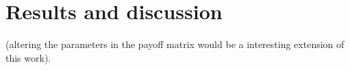 \section{Results and discussion}\label{sec:results}

(altering the parameters in the payoff matrix would be a interesting extension of this work).

